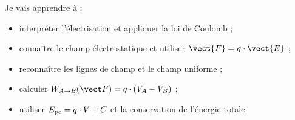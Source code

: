 \begin{minipage}[t]{0.485\linewidth}\RaggedRight\vspace{0pt}
\begin{tcolorbox}[enhanced,colback=cBlue!5,colframe=cBlue!5,arc=3mm,left=4mm,right=4mm,top=3mm,bottom=3mm,
  title={\sffamily\bfseries\color{cBlue}Objectifs du chapitre},detach title,before upper={\tcbtitle\par\smallskip},fontupper=\small\RaggedRight]
Je vais apprendre à :
\begin{itemize}
  \item interpréter l’électrisation et appliquer la loi de Coulomb ;
  \item connaître le champ électrostatique et utiliser $\vect{F} = q\cdot\vect{E}$ ;
  \item reconnaître les lignes de champ et le champ uniforme ;
  \item calculer $\W{A}{B} = q\cdot(V_A - V_B)$ ;
  \item utiliser $E_{\mathrm{pe}} = q\cdot V + C$ et la conservation de l’énergie totale.
\end{itemize}
\end{tcolorbox}
\end{minipage}\hfill
